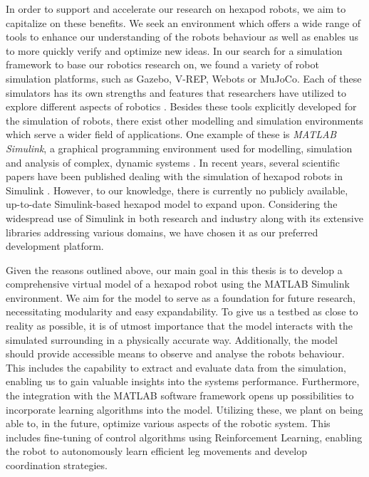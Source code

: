 In order to support and accelerate our research on hexapod robots, we aim to capitalize on these benefits.
We seek an environment which offers a wide range of tools to enhance our understanding of the robots behaviour as well as enables us to more quickly verify and optimize new ideas.
In our search for a simulation framework to base our robotics research on, we found a variety of robot simulation platforms, such as Gazebo, V-REP, Webots or MuJoCo. 
Each of these simulators has its own strengths and features that researchers have utilized to explore different aspects of robotics \parencite{de2019analysis, collins2021review}.
Besides these tools explicitly developed for the simulation of robots, there exist other modelling and simulation environments which serve a wider field of applications.
One example of these is \textit{MATLAB Simulink\textsuperscript{\textregistered}}, a graphical programming environment used for modelling, simulation and analysis of complex, dynamic systems \parencite{Simulink}.
In recent years, several scientific papers have been published dealing with the simulation of hexapod robots in Simulink \parencite{tanaka2019development, barai2013smart, atify2019propelling}.
However, to our knowledge, there is currently no publicly available, up-to-date Simulink-based hexapod model to expand upon.
Considering the widespread use of Simulink in both research and industry along with its extensive libraries addressing various domains, we have chosen it as our preferred development platform.

Given the reasons outlined above, our main goal in this thesis is to develop a comprehensive virtual model of a hexapod robot using the MATLAB Simulink\textsuperscript{\textregistered} environment.
We aim for the model to serve as a foundation for future research, necessitating modularity and easy expandability.
To give us a testbed as close to reality as possible, it is of utmost importance that the model interacts with the simulated surrounding in a physically accurate way.
Additionally, the model should provide accessible means to observe and analyse the robots behaviour.
This includes the capability to extract and evaluate data from the simulation, enabling us to gain valuable insights into the systems performance.
Furthermore, the integration with the MATLAB software framework opens up possibilities to incorporate learning algorithms into the model.
Utilizing these, we plant on being able to, in the future, optimize various aspects of the robotic system. 
This includes fine-tuning of control algorithms using Reinforcement Learning, enabling the robot to autonomously learn efficient leg movements and develop coordination strategies.

